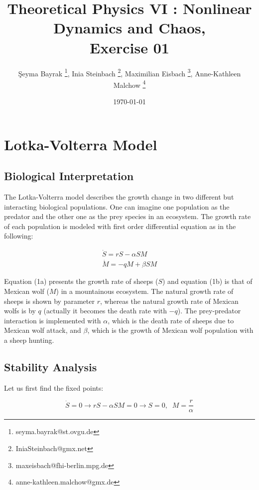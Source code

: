 \documentclass[12pt]{article}
\title{Theoretical Physics VI :  Nonlinear Dynamics and Chaos, \\ Exercise 01}
\author{\c{S}eyma Bayrak \thanks{seyma.bayrak@st.ovgu.de}, Inia Steinbach \thanks{IniaSteinbach@gmx.net}, Maximilian Eisbach \thanks{maxeisbach@fhi-berlin.mpg.de}, Anne-Kathleen Malchow \thanks{anne-kathleen.malchow@gmx.de}}
\date{\today}
\begin{document}
   \maketitle
   

	\section{Lotka-Volterra Model}	

\subsection{Biological Interpretation}

The Lotka-Volterra model describes the growth change in two different but interacting biological populations. One can imagine one population as the predator and the other one as the prey species in an ecosystem. The growth rate of each population is modeled with first order differential equation as in the following:

\begin{subequations}
 \begin{align}\dot{S} = rS - \alpha SM \label{eqn: frobenius 1}\\  \dot{M} = -qM + \beta SM \label{eqn: frobenius 2} 
 \end{align} 
\end{subequations}

Equation (1a) presents the growth rate of sheeps ($S$) and equation (1b) is that of Mexican wolf ($M$) in a mountainous ecosystem. The natural growth rate of sheeps is shown by parameter $r$, whereas the natural growth rate of Mexican wolfs is by $q$ (actually it becomes the death rate with $-q$). The prey-predator interaction is implemented with $\alpha$, which is the death rate of sheeps due to Mexican wolf attack, and $\beta$, which is the growth of Mexican wolf population with a sheep hunting.

\newpage

\subsection{Stability Analysis}

Let us first find the fixed points:

\begin{equation*}
\dot{S} = 0 \longrightarrow rS - \alpha SM = 0 \longrightarrow S =0, \;\; M=\frac{r}{\alpha} 
\end{equation*}
\end{document}
